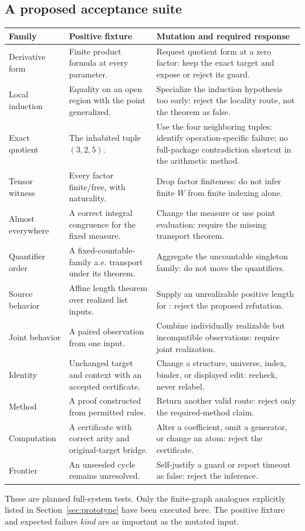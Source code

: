 \documentclass[11pt,a4paper]{article}
\theoremstyle{definition}
\theoremstyle{remark}
\newcommand{\code}[1]{\texttt{\detokenize{#1}}}
\begin{document}
\subsection{A proposed acceptance suite}
\begin{longtable}{@{}L{.18\textwidth}L{.33\textwidth}L{.41\textwidth}@{}}
\toprule
Family & Positive fixture & Mutation and required response\\
\midrule\endhead
Derivative form & Finite product formula at every parameter. & Request quotient form at a zero factor: keep the exact target and expose or reject its guard.\\
Local induction & Equality on an open region with the point generalized. & Specialize the induction hypothesis too early: reject the locality route, not the theorem as false.\\
Exact quotient & The inhabited tuple $(3,2,5)$. & Use the four neighboring tuples: identify operation-specific failure; no full-package contradiction shortcut in the arithmetic method.\\
Tensor witness & Every factor finite/free, with naturality. & Drop factor finiteness: do not infer finite $W$ from finite indexing alone.\\
Almost everywhere & A correct integral congruence for the fixed measure. & Change the measure or use point evaluation: require the missing transport theorem.\\
Quantifier order & A fixed-countable-family a.e. transport under its theorem. & Aggregate the uncountable singleton family: do not move the quantifiers.\\
Source behavior & Affine length theorem over realized list inputs. & Supply an unrealizable positive length for \code{List Empty}: reject the proposed refutation.\\
Joint behavior & A paired observation from one input. & Combine individually realizable but incompatible observations: require joint realization.\\
Identity & Unchanged target and context with an accepted certificate. & Change a structure, universe, index, binder, or displayed edit: recheck, never relabel.\\
Method & A proof constructed from permitted rules. & Return another valid route: reject only the required-method claim.\\
Computation & A certificate with correct arity and original-target bridge. & Alter a coefficient, omit a generator, or change an atom: reject the certificate.\\
Frontier & An unseeded cycle remains unresolved. & Self-justify a guard or report timeout as false: reject the inference.\\
\bottomrule
\end{longtable}
These are planned full-system tests. Only the finite-graph analogues explicitly
listed in Section~\ref{sec:prototype} have been executed here. The positive
fixture and expected failure \emph{kind} are as important as the mutated input.
\end{document}
